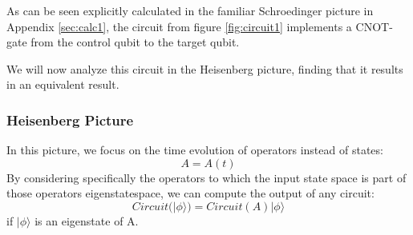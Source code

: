 As can be seen explicitly calculated in the familiar Schroedinger 
picture in Appendix \ref{sec:calc1}, the circuit from figure 
\ref{fig:circuit1} implements a 
CNOT-gate from the control qubit to the target qubit.

We will now analyze this circuit in the Heisenberg picture,
finding that it results in an equivalent result.

\subsubsection{Heisenberg Picture}
In this picture, we focus on the time evolution of operators instead
of states:
\begin{equation}
	A = A(t)
\end{equation}
By considering specifically the operators to which the input state
space is part of those operators eigenstatespace, we can compute
the output of any circuit:
\begin{equation}
	Circuit(|\phi\rangle) = Circuit(A)|\phi\rangle
\end{equation}
if $|\phi\rangle$ is an eigenstate of A.
